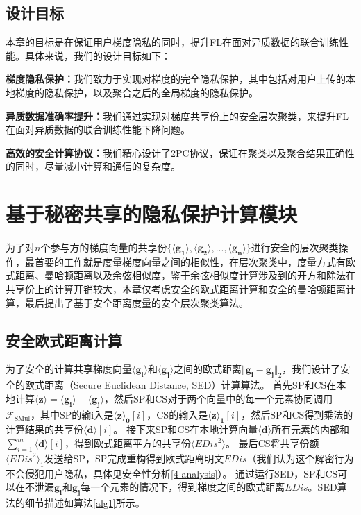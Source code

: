 \subsection{设计目标}
本章的目标是在保证用户梯度隐私的同时，提升FL在面对异质数据的联合训练性能。具体来说，我们的设计目标如下：
\begin{compactitem}
    \item \textbf{梯度隐私保护：}我们致力于实现对梯度的完全隐私保护，其中包括对用户上传的本地梯度的隐私保护，以及聚合之后的全局梯度的隐私保护。
    \item \textbf{异质数据准确率提升：}我们通过实现对梯度共享份上的安全层次聚类，来提升FL在面对异质数据的联合训练性能下降问题。
    \item \textbf{高效的安全计算协议：}我们精心设计了2PC协议，保证在聚类以及聚合结果正确性的同时，尽量减小计算和通信的复杂度。
\end{compactitem}

\section{基于秘密共享的隐私保护计算模块}\label{4-building}
为了对$n$个参与方的梯度向量的共享份$\{\boldsymbol{\langle g_1\rangle}, \boldsymbol{\langle g_2\rangle},...,\boldsymbol{\langle g_n\rangle} \}$进行安全的层次聚类操作，最首要的工作就是度量梯度向量之间的相似性，在层次聚类中，度量方式有欧式距离、曼哈顿距离以及余弦相似度，鉴于余弦相似度计算涉及到的开方和除法在共享份上的计算开销较大，本章仅考虑安全的欧式距离计算和安全的曼哈顿距离计算，最后提出了基于安全距离度量的安全层次聚类算法。

\subsection{安全欧式距离计算}
为了安全的计算共享梯度向量$\boldsymbol{\langle g_i\rangle}$和$\boldsymbol{\langle g_j\rangle}$之间的欧式距离$\Vert \boldsymbol{g_i} - \boldsymbol{g_j} \Vert_2$，我们设计了安全的欧式距离（Secure Euclidean Distance, SED）计算算法。
首先SP和CS在本地计算$\boldsymbol{\langle z\rangle} = \boldsymbol{\langle g_i\rangle} - \boldsymbol{\langle g_j\rangle}$，然后SP和CS对于两个向量中的每一个元素协同调用$\mathcal{F}_{\text {SMul}}$，其中SP的输i入是$\boldsymbol{\langle z\rangle_0}[i]$，CS的输入是$\boldsymbol{\langle z\rangle_1}[i]$，然后SP和CS得到乘法的计算结果的共享份$\boldsymbol{\langle d\rangle}[i]$。
接下来SP和CS在本地计算向量$\boldsymbol{\langle d\rangle}$所有元素的内部和$\sum_{i=1}^{m} \boldsymbol{\langle d\rangle}[i]$，得到欧式距离平方的共享份$\langle \textit{EDis}^2\rangle$。
最后CS将共享份额$\langle \textit{EDis}^2\rangle_1$发送给SP，SP完成重构得到欧式距离明文$\textit{EDis}$（我们认为这个解密行为不会侵犯用户隐私，具体见安全性分析\ref{4-analysis}）。
通过运行SED，SP和CS可以在不泄漏$\boldsymbol{g_i}$和$\boldsymbol{g_j}$每一个元素的情况下，得到梯度之间的欧式距离$\textit{EDis}$。SED算法的细节描述如算法\ref{alg1}所示。

